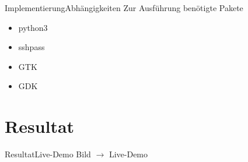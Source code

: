 \documentclass[ngerman,10pt,xcolor=colortbl,compress
]{beamer}
\begin{document}
	\begin{frame}{Implementierung}{Abhängigkeiten}
		Zur Ausführung benötigte Pakete
		\begin{itemize}
			\item python3
			\item sshpass
			\item GTK
			\item GDK
		\end{itemize}
	\end{frame}
	
	\section{Resultat}
	\begin{frame}{Resultat}{Live-Demo}
	Bild $\rightarrow$ Live-Demo
	\end{frame}

	
\end{document}
